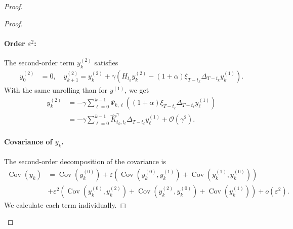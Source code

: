 \documentclass[11pt]{article}
\newcommand{\EE}{\mathbb{E}}
\newcommand{\cov}{\operatorname{Cov}}
\begin{document}
\begin{proof}
\begin{proof}
\paragraph{Order \(\varepsilon^2\):} The second-order term $y^{(2)}_k$ satisfies
\begin{align*}
   y^{(2)}_0 &= 0, \quad  y^{(2)}_{k+1} = y^{(2)}_{k} + \gamma \left(H_{t_k} y^{(2)}_k - (1 + \alpha) \xi_{T-t_k}\Delta_{T-t_k} y^{(1)}_k\right).
\end{align*}
With the same unrolling than for $y^{(1)}$, we get
\begin{align*}
    y^{(2)}_k &= - \gamma \sum_{\ell=0}^{k-1} \Psi_{k,\ell} \left((1 + \alpha) \xi_{T-t_\ell}\Delta_{T-t_\ell} y^{(1)}_\ell \right) \\
    &= - \gamma \sum_{\ell=0}^{k-1} \hat K^\gamma_{t_k,t_\ell} \Delta_{T-t_\ell} y^{(1)}_\ell  + \mathcal{O}(\gamma^2).
\end{align*}
\paragraph{Covariance of $y_k$.} The second-order decomposition of the covariance is
\begin{align*}
\cov(y_k) &= \cov(y^{(0)}_k) + \varepsilon \left( \cov(y^{(0)}_k, y^{(1)}_k) + \cov(y^{(1)}_k, y^{(0)}_k) \right) \\
&+ \varepsilon^2 \left( \cov(y^{(0)}_k, y^{(2)}_k)  + \cov(y^{(2)}_k, y^{(0)}_k) + \cov(y^{(1)}_k) \right)  + o(\varepsilon^2).
\end{align*}
We calculate each term individually. 

\end{proof}
\end{proof}
\end{document}
